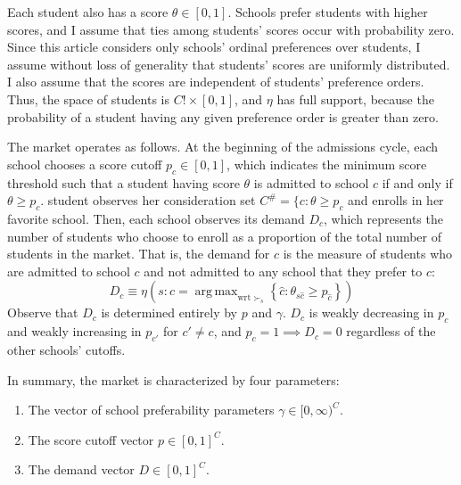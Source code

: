 \documentclass[12pt]{article}
\numberwithin{equation}{subsection}
\theoremstyle{definition}
\DeclareMathOperator*{\argmax}{arg\,max}
\begin{document}
Each student also has a score $\theta \in [0,1]$. Schools prefer students with higher scores, and I assume that ties among students' scores occur with probability zero. Since this article considers only schools' ordinal preferences over students, I assume without loss of generality that students' scores are uniformly distributed. I also assume that the scores are independent of students' preference orders. Thus, the space of students is $C! \times [0, 1]$, and $\eta$ has full support, because the probability of a student having any given preference order is greater than zero. 

The market operates as follows. At the beginning of the admissions cycle, each school chooses a score cutoff $p_c \in [0, 1]$, which indicates the minimum score threshold such that a student having score $\theta$ is admitted to school $c$ if and only if $\theta \geq p_c$.  student observes her consideration set  $C^\# = \{c: \theta \geq p_c$ and enrolls in her favorite school. Then, each school observes its demand $D_c$, which represents the number of students who choose to enroll as a proportion of the total number of students in the market. That is, the demand for $c$  is the measure of students who are admitted to school $c$ and not admitted to any school that they prefer to $c$:
\begin{equation} \label{demanddefinition}
D_c \equiv \eta\left(s: c = \argmax_{\text{wrt } \succ_s} \left\{\hat c: \theta_{s\hat c} \geq p_{\hat c} \right\}\right)
\end{equation}
Observe that $D_c$ is determined entirely by $p$ and $\gamma$. $D_c$ is weakly decreasing in $p_c$ and weakly increasing in $p_{c'}$ for $c' \neq c$, and $p_c = 1 \implies D_c = 0$ regardless of the other schools' cutoffs.

In summary, the market is characterized by four parameters:
\begin{enumerate}
\item The vector of school preferability parameters $\gamma \in [0, \infty)^C$. 
\item The score cutoff vector $p \in [0, 1]^C$. 
\item The demand vector $D \in [0, 1]^C$.
\end{enumerate}
\end{document}
